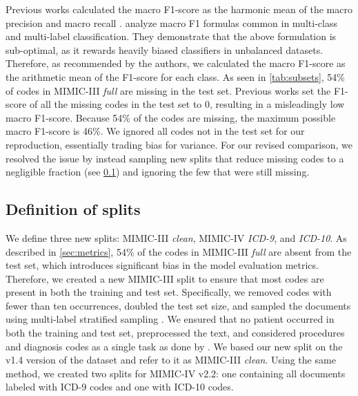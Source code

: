 {Previous works calculated the macro F1-score as the harmonic mean of the macro precision and macro recall \parencite{mullenbachExplainablePredictionMedical2018, liICDCodingClinical2020, vuLabelAttentionModel2020, huangPLMICDAutomaticICD2022}. \textcite{opitzMacroF1Macro2021} analyze macro F1 formulas common in multi-class and multi-label classification. They demonstrate that the above formulation is sub-optimal, as it rewards heavily biased classifiers in unbalanced datasets. Therefore, as recommended by the authors, we calculated the macro F1-score as the arithmetic mean of the F1-score for each class.
As seen in \cref{tab:subsets}, 54\% of codes in MIMIC-III \textit{full} are missing in the test set. Previous works set the F1-score of all the missing codes in the test set to 0, resulting in a misleadingly low macro F1-score. Because 54\% of the codes are missing, the maximum possible macro F1-score is 46\%. 
We ignored all codes not in the test set for our reproduction, essentially trading bias for variance. 
For our revised comparison, we resolved the issue by instead sampling new splits that reduce missing codes to a negligible fraction (see \cref{sec: splits}) and ignoring the few that were still missing.


\subsection{Definition of splits}
\label{sec: splits}


We define three new splits: MIMIC-III \textit{clean}, MIMIC-IV \textit{ICD-9}, and \textit{ICD-10}.
As described in \cref{sec:metrics}, 54\% of the codes in MIMIC-III \textit{full} are absent from the test set, which introduces significant bias in the model evaluation metrics. Therefore, we created a new MIMIC-III split to ensure that most codes are present in both the training and test set. 
Specifically, we removed codes with fewer than ten occurrences, doubled the test set size, and sampled the documents using multi-label stratified sampling \parencite{sechidisStratificationMultilabelData2011}. 
We ensured that no patient occurred in both the training and test set, preprocessed the text, and considered procedures and diagnosis codes as a single task as done by \textcite{mullenbachExplainablePredictionMedical2018}.
We based our new split on the v1.4 version of the dataset and refer to it as MIMIC-III \textit{clean}.
Using the same method, we created two splits for MIMIC-IV v2.2: one containing all documents labeled with ICD-9 codes and one with ICD-10 codes.


}
